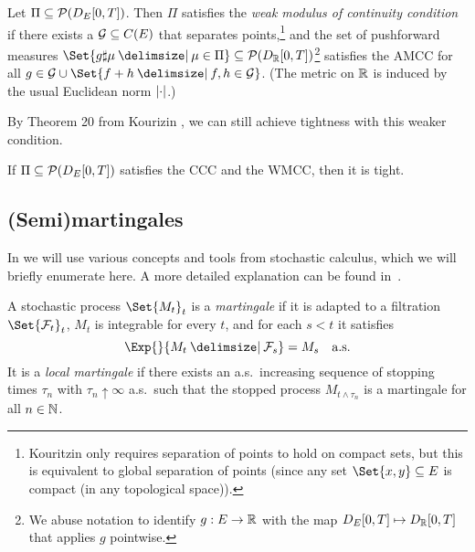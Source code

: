 \begin{definition}[WMCC]\label{def:WMCC}
  Let \( \Pi \subseteq \mathcal{P}(D_{E}[0,T]) \).
  Then \( \Pi \) satisfies the \textit{weak modulus of continuity condition} if there exists a \( \mathcal{G} \subseteq C(E) \) that separates points,\footnote{Kouritzin only requires separation of points to hold on compact sets, but this is equivalent to global separation of points (since any set \( \Set{x,y} \subseteq E \) is compact (in any topological space)).}
  and the set of pushforward measures \( \Set{g \sharp \mu \given \mu \in \Pi} \subseteq \cP(D_\bR[0,T]) \)\footnote{We abuse notation to identify \( g : E \to \mathbb{R} \) with the map \( D_E[0,T] \mapsto D_{\mathbb{R}}[0,T] \) that applies \( g \) pointwise.} satisfies the AMCC for all \( g \in \cG \cup \Set{f + h \given f, h \in \cG} \).
  (The metric on \( \mathbb{R} \) is induced by the usual Euclidean norm \( \lvert\cdot\rvert \).)
\end{definition}

By Theorem 20 from Kourizin \cite{kouritzinTightnessProbabilityMeasures2015}, we can still achieve tightness with this weaker condition.

\begin{theorem}\label{thm:ccc+wmcc=tight}
  If \( \Pi \subseteq \mathcal{P}(D_{E}[0,T]) \) satisfies the CCC and the WMCC, then it is tight.
\end{theorem}

\subsection{(Semi)martingales}

In  we will use various concepts and tools from stochastic calculus, which we will briefly enumerate here.
A more detailed explanation can be found in~\cite{klebanerIntroductionStochasticCalculus2012}.

\begin{definition}
  A stochastic process \(\Set{M_t}_{t}\) is a \textit{martingale} if it is adapted to a filtration \(\Set{\cF_t}_t\), \( M_t \) is integrable for every \(t\), and for each \( s < t \) it satisfies
  \begin{equation}
    \Exp{}{M_t \given \cF_s} = M_s \quad \text{a.s.}
  \end{equation}
  It is a \textit{local martingale} if there exists an a.s.\ increasing sequence of stopping times \( \tau_n \) with \( \tau_n \uparrow \infty \) a.s.\ such that the stopped process \( M_{t \land \tau_n} \) is a martingale for all \( n \in \mathbb{N} \). %
\end{definition}

